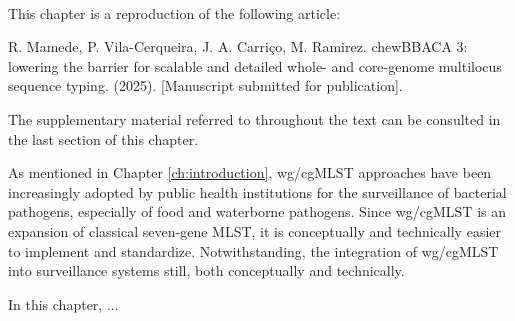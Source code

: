 \mbox{}\\
\vspace{8cm}

This chapter is a reproduction of the following article:

R. Mamede, P. Vila-Cerqueira, J. A. Carriço, M. Ramirez. chewBBACA 3: lowering the barrier for scalable and detailed whole- and core-genome multilocus sequence typing. (2025). [Manuscript submitted for publication].

The supplementary material referred to throughout the text can be consulted in the last section of this chapter.

As mentioned in Chapter \ref{ch:introduction}, \ac{wg/cgMLST} approaches have been increasingly adopted by public health institutions for the surveillance of bacterial pathogens, especially of food and waterborne pathogens. Since wg/cgMLST is an expansion of classical seven-gene MLST, it is conceptually and technically easier to implement and standardize.
Notwithstanding, the integration of wg/cgMLST into surveillance systems still, both conceptually and technically.

In this chapter, ...





